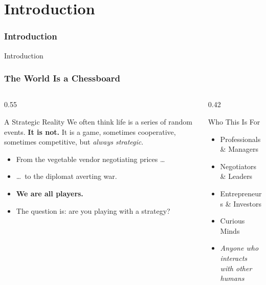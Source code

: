 \section{Introduction}

\begin{frame}[fragile]\frametitle{Introduction}
\begin{center}
{\Large Introduction}
\end{center}
\end{frame}

\begin{frame}[fragile]\frametitle{The World Is a Chessboard}
  \begin{columns}
    \begin{column}[T]{0.55\linewidth}
      \begin{block}{A Strategic Reality}
        We often think life is a series of random events. \textbf{It is not.}
        It is a game, sometimes cooperative, sometimes competitive, but \textit{always strategic}.
      \end{block}
      \vspace{8pt}
      \begin{itemize}
        \item From the vegetable vendor negotiating prices \ldots
        \item \ldots\ to the diplomat averting war.
        \item \textbf{We are all players.}
        \item The question is: are you playing with a strategy?
      \end{itemize}
    \end{column}
    \begin{column}[T]{0.42\linewidth}
      \begin{block}{Who This Is For}
        \begin{itemize}
          \item Professionals \& Managers
          \item Negotiators \& Leaders
          \item Entrepreneurs \& Investors
          \item Curious Minds
          \item \textit{Anyone who interacts with other humans}
        \end{itemize}
      \end{block}
    \end{column}
  \end{columns}
\end{frame}


